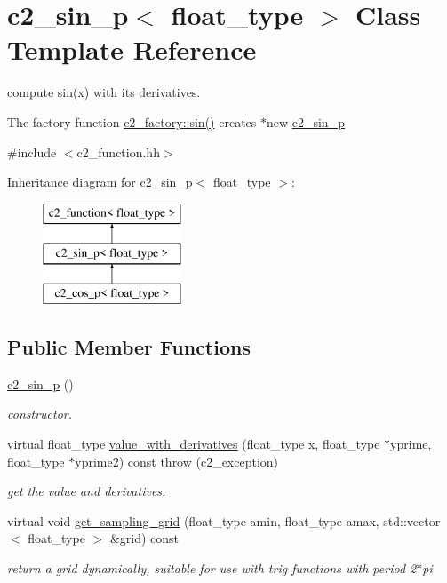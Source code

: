 \hypertarget{classc2__sin__p}{\section{c2\-\_\-sin\-\_\-p$<$ float\-\_\-type $>$ Class Template Reference}
\label{classc2__sin__p}
}


compute sin(x) with its derivatives.

The factory function \hyperlink{classc2__factory_a866854d4fdd6c6678512151dbcd635a5}{c2\-\_\-factory\-::sin()} creates $\ast$new \hyperlink{classc2__sin__p}{c2\-\_\-sin\-\_\-p}  




{\ttfamily \#include $<$c2\-\_\-function.\-hh$>$}

Inheritance diagram for c2\-\_\-sin\-\_\-p$<$ float\-\_\-type $>$\-:\begin{figure}[H]
\begin{center}
\leavevmode
\includegraphics[height=3.000000cm]{classc2__sin__p}
\end{center}
\end{figure}
\subsection*{Public Member Functions}
\begin{DoxyCompactItemize}
\item 
\hypertarget{classc2__sin__p_a56b29be4cdd63a55e0b14e99a9eaa3dd}{\hyperlink{classc2__sin__p_a56b29be4cdd63a55e0b14e99a9eaa3dd}{c2\-\_\-sin\-\_\-p} ()}\label{classc2__sin__p_a56b29be4cdd63a55e0b14e99a9eaa3dd}

\begin{DoxyCompactList}\small\item\em constructor. \end{DoxyCompactList}\item 
virtual float\-\_\-type \hyperlink{classc2__sin__p_a9710a5d48360f4c6e1568f1ad849dd7b}{value\-\_\-with\-\_\-derivatives} (float\-\_\-type x, float\-\_\-type $\ast$yprime, float\-\_\-type $\ast$yprime2) const   throw (c2\-\_\-exception)
\begin{DoxyCompactList}\small\item\em get the value and derivatives. \end{DoxyCompactList}\item 
virtual void \hyperlink{classc2__sin__p_a24cee8161741bd4a4dbb24dd782514c1}{get\-\_\-sampling\-\_\-grid} (float\-\_\-type amin, float\-\_\-type amax, std\-::vector$<$ float\-\_\-type $>$ \&grid) const 
\begin{DoxyCompactList}\small\item\em return a grid dynamically, suitable for use with trig functions with period 2$\ast$pi \end{DoxyCompactList}\end{DoxyCompactItemize}
